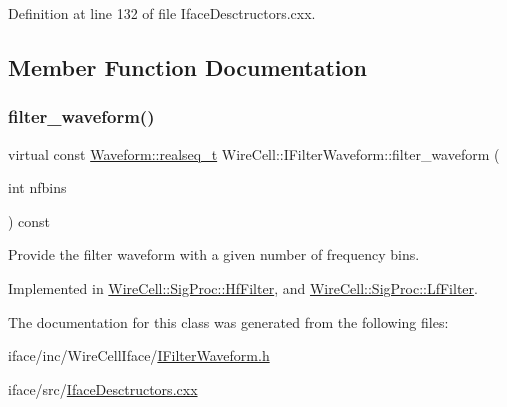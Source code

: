 Definition at line 132 of file Iface\+Desctructors.\+cxx.



\subsection{Member Function Documentation}
\mbox{\label{class_wire_cell_1_1_i_filter_waveform_a7757f5772c9974a6c76bebcc856a3069}} 
\subsubsection{\texorpdfstring{filter\+\_\+waveform()}{filter\_waveform()}}
{\footnotesize\ttfamily virtual const \hyperlink{namespace_wire_cell_1_1_waveform_a479175e541c8545e87cd8063b74b6956}{Waveform\+::realseq\+\_\+t} Wire\+Cell\+::\+I\+Filter\+Waveform\+::filter\+\_\+waveform (\begin{DoxyParamCaption}\item[{int}]{nfbins }\end{DoxyParamCaption}) const\hspace{0.3cm}{\ttfamily [pure virtual]}}



Provide the filter waveform with a given number of frequency bins. 



Implemented in \hyperlink{class_wire_cell_1_1_sig_proc_1_1_hf_filter_a4b34ce856b103ea1cfff4d418b1aae6d}{Wire\+Cell\+::\+Sig\+Proc\+::\+Hf\+Filter}, and \hyperlink{class_wire_cell_1_1_sig_proc_1_1_lf_filter_a4b53fff2e1a37331fa8d8a62438c581f}{Wire\+Cell\+::\+Sig\+Proc\+::\+Lf\+Filter}.



The documentation for this class was generated from the following files\+:\begin{DoxyCompactItemize}
\item 
iface/inc/\+Wire\+Cell\+Iface/\hyperlink{_i_filter_waveform_8h}{I\+Filter\+Waveform.\+h}\item 
iface/src/\hyperlink{_iface_desctructors_8cxx}{Iface\+Desctructors.\+cxx}\end{DoxyCompactItemize}
